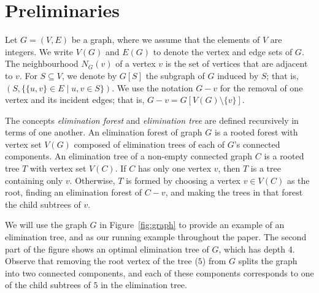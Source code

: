 {    \section{Preliminaries}\label{sec:preliminaries}

    Let $G=(V,E)$ be a graph, where we assume that the elements of $V$ are integers.
    We write $V(G)$ and $E(G)$ to denote the vertex and edge sets of $G$.
    The neighbourhood $N_G(v)$ of a vertex $v$ is the set of vertices that are adjacent to $v$.
    For $S \subseteq V$, we denote by $G[S]$ the subgraph of $G$
    induced by $S$; that is, $(S, \{\{u,v\} \in E \mid u,v \in S\})$.
    We use the notation $G - v$ for the removal of one vertex and its incident edges;
    that is, $G - v = G[V(G) \setminus \{v\}]$.

    The concepts \emph{elimination forest} and \emph{elimination tree}
    are defined recursively in terms of one another.  An elimination forest of graph $G$ is
    a rooted forest with vertex set $V(G)$ composed of elimination trees of each of $G$'s connected components.
    An elimination tree of a non-empty connected graph $C$ is a rooted tree $T$ with vertex set
    $V(C)$.  If $C$ has only one vertex $v$, then $T$ is a tree containing only $v$.  Otherwise,
    $T$ is formed by choosing a vertex $v \in V(C)$ as the root, finding an elimination forest
    of $C - v$, and making the trees in that forest the child subtrees of $v$.

    We will use the graph $G$ in Figure~\ref{fig:graph} to provide an example of an elimination
    tree, and as our running example throughout the paper.
    The second part of the figure shows an optimal elimination tree of $G$,
    which has depth 4.  Observe that removing the root vertex of the tree ($5$) from $G$
    splits the graph into two connected components, and each of these components corresponds to
    one of the child subtrees of $5$ in the elimination tree.

    \begin{figure}[htb]
      \centering
\end{figure}}
